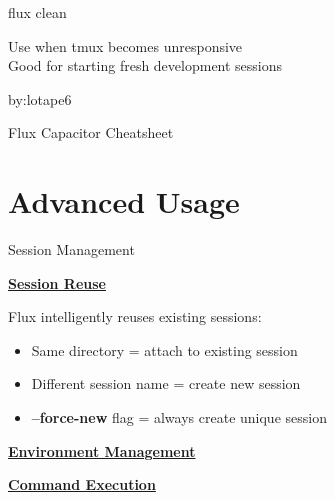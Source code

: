 \documentclass[10pt,a4paper]{article}
\begin{document}
\begin{multicols}{3}
\begin{textbox}{flux clean}

Use when tmux becomes unresponsive\\

Good for starting fresh development sessions\\

\end{textbox}

\vfill\null
\columnbreak

\centering
\vspace{6pt}
by:\Large \color{greenbash}lotape6 \scriptsize

\raggedright

\centering

\huge \color{fluxblue}Flux {\color{blues}Capacitor} \color{white} Cheatsheet \scriptsize 

\raggedright
\vspace{5mm}

\section{Advanced Usage}

\begin{textbox}{Session Management}

\underline{\textbf{Session Reuse}}

Flux intelligently reuses existing sessions:
\begin{itemize}
    \item Same directory = attach to existing session
    \item Different session name = create new session
    \item \textbf{--force-new} flag = always create unique session
\end{itemize}

\underline{\textbf{Environment Management}}




\underline{\textbf{Command Execution}}





\end{textbox}
\end{multicols}
\end{document}
